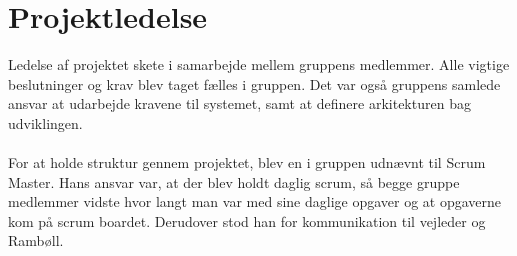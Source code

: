 \section{Projektledelse}
Ledelse af projektet skete i samarbejde mellem gruppens medlemmer. Alle vigtige beslutninger og krav blev taget fælles i gruppen.
Det var også gruppens samlede ansvar at udarbejde kravene til systemet, samt at definere arkitekturen bag udviklingen. \\ \\
For at holde struktur gennem projektet, blev en i gruppen udnævnt til Scrum Master. Hans ansvar var, at der blev holdt daglig scrum, så begge gruppe medlemmer vidste hvor langt man var med sine daglige opgaver og at opgaverne kom på scrum boardet. Derudover stod han for kommunikation til vejleder og Rambøll. \\
